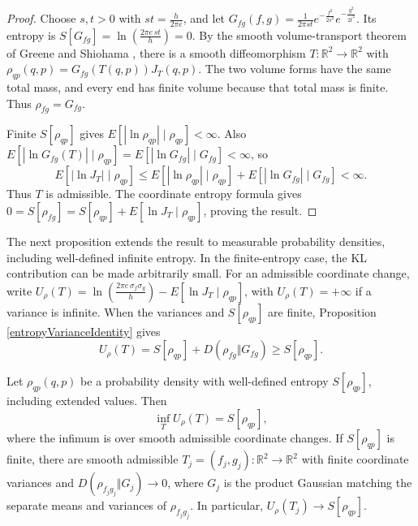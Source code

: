 \documentclass{techbrief}
\begin{document}
\begin{proof}
	Choose $s,t>0$ with $st=\frac{h}{2\pi e}$, and let $G_{fg}(f,g)=\frac{1}{2\pi st}e^{-\frac{f^2}{2s^2}}e^{-\frac{g^2}{2t^2}}$. Its entropy is $S[G_{fg}]=\ln\left(\frac{2\pi e\,st}{h}\right)=0$. By the smooth volume-transport theorem of Greene and Shiohama \cite[Theorem 1]{GreeneShiohama}, there is a smooth diffeomorphism $T:\mathbb{R}^2\to\mathbb{R}^2$ with $\rho_{qp}(q,p)=G_{fg}(T(q,p))J_T(q,p)$. The two volume forms have the same total mass, and every end has finite volume because that total mass is finite. Thus $\rho_{fg}=G_{fg}$.

	Finite $S[\rho_{qp}]$ gives $E[|\ln\rho_{qp}|\mid\rho_{qp}]<\infty$. Also $E[|\ln G_{fg}(T)|\mid\rho_{qp}]=E[|\ln G_{fg}|\mid G_{fg}]<\infty$, so
	\begin{equation*}
		E[|\ln J_T|\mid\rho_{qp}]\leq E[|\ln\rho_{qp}|\mid\rho_{qp}]+E[|\ln G_{fg}|\mid G_{fg}]<\infty.
	\end{equation*}
	Thus $T$ is admissible. The coordinate entropy formula gives $0=S[\rho_{fg}]=S[\rho_{qp}]+E[\ln J_T\mid\rho_{qp}]$, proving the result.
\end{proof}

The next proposition extends the result to measurable probability densities, including well-defined infinite entropy. In the finite-entropy case, the KL contribution can be made arbitrarily small. For an admissible coordinate change, write $U_\rho(T)=\ln\left(\frac{2\pi e\,\sigma_f\sigma_g}{h}\right)-E[\ln J_T\mid\rho_{qp}]$, with $U_\rho(T)=+\infty$ if a variance is infinite. When the variances and $S[\rho_{qp}]$ are finite, Proposition \ref{entropyVarianceIdentity} gives
\begin{equation*}
	U_\rho(T)=S[\rho_{qp}]+D(\rho_{fg}\Vert G_{fg})\geq S[\rho_{qp}].
\end{equation*}

\begin{prop}\label{measurableEntropyCoordinates}
	Let $\rho_{qp}(q,p)$ be a probability density with well-defined entropy $S[\rho_{qp}]$, including extended values. Then
	\begin{equation}\label{entropyCoordinateInfimum}
		\inf_T U_\rho(T)=S[\rho_{qp}],
	\end{equation}
	where the infimum is over smooth admissible coordinate changes. If $S[\rho_{qp}]$ is finite, there are smooth admissible $T_j=(f_j,g_j):\mathbb{R}^2\to\mathbb{R}^2$ with finite coordinate variances and $D(\rho_{f_jg_j}\Vert G_j)\to0$, where $G_j$ is the product Gaussian matching the separate means and variances of $\rho_{f_jg_j}$. In particular, $U_\rho(T_j)\to S[\rho_{qp}]$.
\end{prop}
\end{document}
